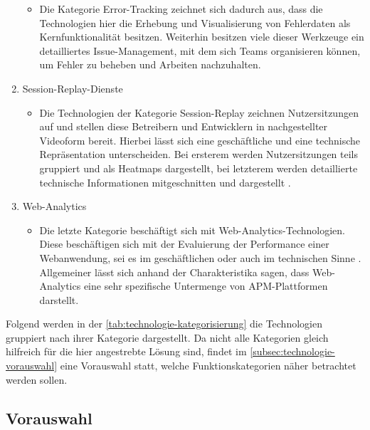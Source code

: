 \begin{enumerate}
\begin{itemize}
		\item Die Kategorie Error-Tracking zeichnet sich dadurch aus, dass die Technologien hier die Erhebung und Visualisierung von Fehlerdaten als Kernfunktionalität besitzen. Weiterhin besitzen viele dieser Werkzeuge ein detailliertes Issue-Management, mit dem sich Teams organisieren können, um Fehler zu beheben und Arbeiten nachzuhalten.
	\end{itemize}
	\pagebreak
	\item Session-Replay-Dienste
	\begin{itemize}
		\item Die Technologien der Kategorie Session-Replay zeichnen Nutzersitzungen auf und stellen diese Betreibern und Entwicklern in nachgestellter Videoform bereit. Hierbei lässt sich eine geschäftliche und eine technische Repräsentation unterscheiden. Bei ersterem werden Nutzersitzungen teils gruppiert und als Heatmaps dargestellt, bei letzterem werden detaillierte technische Informationen mitgeschnitten und dargestellt \cite{Webalyt}.
	\end{itemize}
	\item Web-Analytics
	\begin{itemize}
		\item Die letzte Kategorie beschäftigt sich mit Web-Analytics-Technologien. Diese beschäftigen sich mit der Evaluierung der Performance einer Webanwendung, sei es im geschäftlichen oder auch im technischen Sinne \cite{APracticalEvaluationOfWebAnalytics} \cite{WebAnalyticsAnHourADay}. Allgemeiner lässt sich anhand der Charakteristika sagen, dass Web-Analytics eine sehr spezifische Untermenge von APM-Plattformen darstellt.
	\end{itemize}
\end{enumerate}

Folgend werden in der \autoref{tab:technologie-kategorisierung} die Technologien gruppiert nach ihrer Kategorie dargestellt. Da nicht alle Kategorien gleich hilfreich für die hier angestrebte Lösung sind, findet im \autoref{subsec:technologie-vorauswahl} eine Vorauswahl statt, welche Funktionskategorien näher betrachtet werden sollen.



\subsection{Vorauswahl}
\label{subsec:technologie-vorauswahl}

